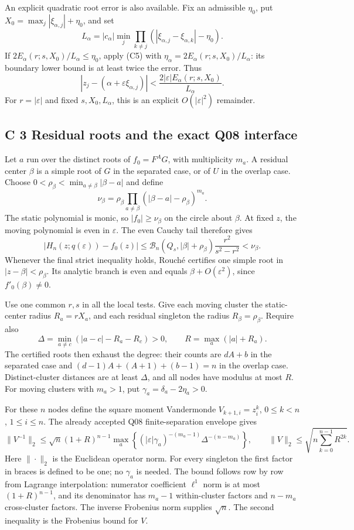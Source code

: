\documentclass[
  11pt,
]{article}
\begin{document}
An explicit quadratic root error is also available. Fix an admissible
\(\eta_0\), put \(X_0=\max_j|\xi_{\alpha,j}|+\eta_0\), and set
\[
L_\alpha=|c_\alpha|\min_j\prod_{k\ne j}
 (|\xi_{\alpha,j}-\xi_{\alpha,k}|-\eta_0).
\]
If \(2E_\alpha(r;s,X_0)/L_\alpha\leq\eta_0\), apply (C5) with
\(\eta_\alpha=2E_\alpha(r;s,X_0)/L_\alpha\): its boundary lower bound
is at least twice the error. Thus
\[
|z_j-(\alpha+\varepsilon\xi_{\alpha,j})|
<\frac{2|\varepsilon|E_\alpha(r;s,X_0)}{L_\alpha}. \tag{C8}
\]
For \(r=|\varepsilon|\) and fixed \(s,X_0,L_\alpha\), this is an
explicit \(O(|\varepsilon|^2)\) remainder.

\subsection{C 3 Residual roots and the exact Q08 interface}

Let \(a\) run over the distinct roots of \(f_0=F^AG\), with
multiplicity \(m_a\). A residual center \(\beta\) is a simple root of
\(G\) in the separated case, or of \(U\) in the overlap case. Choose
\(0<\rho_\beta<\min_{a\ne\beta}|\beta-a|\) and define
\[
\nu_\beta=\rho_\beta\prod_{a\ne\beta}
 (|\beta-a|-\rho_\beta)^{m_a}.
\]
The static polynomial is monic, so \(|f_0|\geq\nu_\beta\) on the
circle about \(\beta\). At fixed \(z\), the moving polynomial is even
in \(\varepsilon\). The even Cauchy tail therefore gives
\[
|H_n(z;q(\varepsilon))-f_0(z)|
\leq\mathcal B_n(Q_s,|\beta|+\rho_\beta)\frac{r^2}{s^2-r^2}
<\nu_\beta. \tag{C9}
\]
Whenever the final strict inequality holds, Rouch\'e certifies one
simple root in \(|z-\beta|<\rho_\beta\). Its analytic branch is even
and equals \(\beta+O(\varepsilon^2)\), since \(f'_0(\beta)\ne0\).

Use one common \(r,s\) in all the local tests. Give each moving cluster
the static-center radius \(R_a=rX_a\), and each residual singleton
the radius \(R_\beta=\rho_\beta\). Require also
\[
\Delta=\min_{a\ne c}(|a-c|-R_a-R_c)>0,
\qquad R=\max_a(|a|+R_a). \tag{C10}
\]
The certified roots then exhaust the degree: their counts are
\(dA+b\) in the separated case and
\((d-1)A+(A+1)+(b-1)=n\) in the overlap case. Distinct-cluster
distances are at least \(\Delta\), and all nodes have modulus at most
\(R\). For moving clusters with \(m_a>1\), put
\(\gamma_a=\delta_a-2\eta_a>0\).

For these \(n\) nodes define the square moment Vandermonde
\(V_{k+1,i}=z_i^k\), \(0\leq k<n\), \(1\leq i\leq n\).
The already accepted Q08 finite-separation envelope gives
\[
\|V^{-1}\|_2\leq\sqrt n(1+R)^{n-1}
\max_a\left\{(|\varepsilon|\gamma_a)^{-(m_a-1)}
                    \Delta^{-(n-m_a)}\right\},
\qquad
\|V\|_2\leq\sqrt{n\sum_{k=0}^{n-1}R^{2k}}.
\tag{C11}
\]
Here \(\|\cdot\|_2\) is the Euclidean operator norm. For every
singleton the first factor in braces is defined to be one; no
\(\gamma_a\) is needed. The bound follows row by row from Lagrange
interpolation: numerator coefficient \(\ell^1\) norm is at most
\((1+R)^{n-1}\), and its denominator has \(m_a-1\) within-cluster
factors and \(n-m_a\) cross-cluster factors. The inverse Frobenius
norm supplies \(\sqrt n\). The second inequality is the Frobenius
bound for \(V\).
\end{document}
